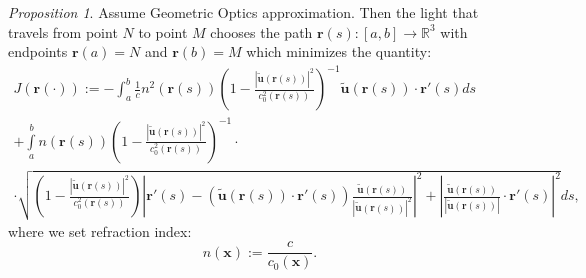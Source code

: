 \documentclass{article}
\newtheorem{proposition}{Proposition}[section]
\theoremstyle{definition}
\theoremstyle{remark}
\renewcommand{\vec}[1]{\mathbf{#1}}
\newcommand{\er}{\eqref}
\newcommand{\er}{\eqref}
\newtheorem{proposition}{Proposition}
\begin{document}
\begin{proposition}\label{gughghfhh}
Assume Geometric Optics approximation.
Then
the light that travels from point $N$ to point $M$ chooses the path
$\vec r(s):[a,b]\to\mathbb{R}^3$ with endpoints $\vec r(a)=N$ and
$\vec r(b)=M$ which minimizes the quantity:
\begin{multline}\label{MaxMedFullGGffgggyyojjhhjkhjyyiuhggjhhjhuyytytyuuytrrtghjtyuggyuighjuyioyyfgffhyuhhghzzrrkkhhkkkhhhjhkjhhghhgghhh}
J\left(\vec r(\cdot)\right):= -\int_a^b\frac{1}{c}n^2\left(\vec
r(s)\right)\left(1-\frac{\left|\vec {\tilde u}\left(\vec
r(s)\right)\right|^2}{c^2_0\left(\vec r(s)\right)}\right)^{-1}\vec
{\tilde u}\left(\vec r(s)\right)\cdot\vec
r'(s)ds\\+\int\limits_a^bn\left(\vec
r(s)\right)\left(1-\frac{\left|\vec {\tilde u}\left(\vec
r(s)\right)\right|^2}{c^2_0\left(\vec r(s)\right)}\right)^{-1}
\cdot\\
\cdot\sqrt{\left(1-\frac{\left|\vec {\tilde u}\left(\vec
r(s)\right)\right|^2}{c^2_0\left(\vec r(s)\right)}\right)\left|\vec
r'(s)-\left(\vec {\tilde u}\left(\vec r(s)\right)\cdot\vec
r'(s)\right)\frac{\vec {\tilde u}\left(\vec r(s)\right)}{\left|\vec
{\tilde u}\left(\vec r(s)\right)\right|^2}\right|^2+\left|\frac{\vec
{\tilde u}\left(\vec r(s)\right)}{\left|\vec {\tilde u}\left(\vec
r(s)\right)\right|}\cdot\vec r'(s)\right|^2}ds,
\end{multline}
where we set refraction index:
\begin{equation}\label{MaxMedFullGGffgggyyojjhhjkhjyyiuhggjhhjhuyytytyuuytrrtghjtyuggyuighjuyioyyfgffhyuhhghzzrrkkhhkkkhhhjhkjhhghhgghiuiuhh}
n\left(\vec x\right):=\frac{c}{c_0\left(\vec x\right)}.
\end{equation}
\end{proposition}
\end{document}
